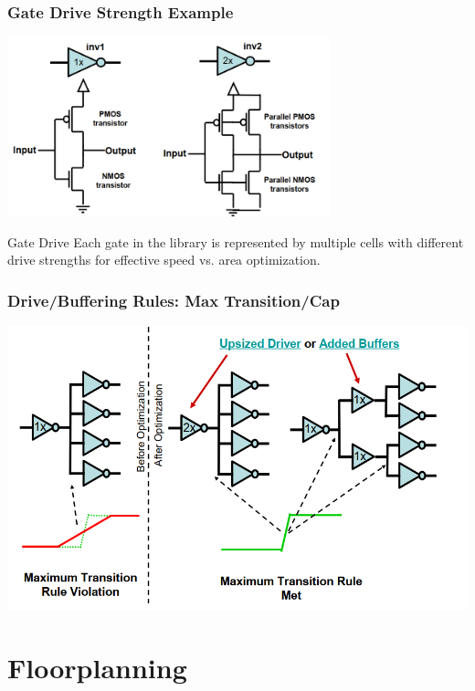 \documentclass[compress]{beamer}
\begin{document}
\begin{frame}
	\frametitle{Gate Drive Strength Example}
	
	\begin{center}
		\includegraphics[width=0.7\textwidth]{Gate Drive}
	\end{center}
\begin{block}{Gate Drive}
	Each gate in the library is represented by multiple cells with
	different drive strengths for effective speed vs. area optimization.
\end{block}
\end{frame}

\begin{frame}
	\frametitle{Drive/Buffering Rules: Max Transition/Cap}
	\begin{center}
		\includegraphics[width=\textwidth]{Rules}
	\end{center}
\end{frame}
\section[Floor]{Floorplanning}
\end{document}

